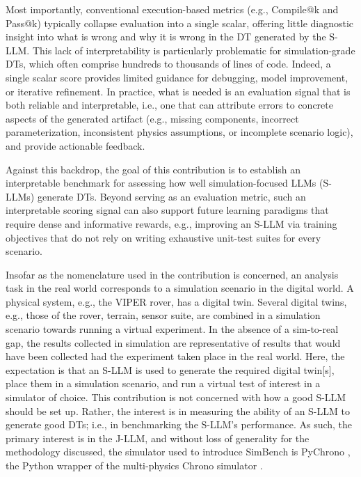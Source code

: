 \documentclass{ieeeaccess}
\begin{document}
Most importantly, conventional execution-based metrics (e.g., Compile@k and Pass@k)
typically collapse evaluation into a single scalar, 
offering little diagnostic insight into what is wrong and why it is wrong in the DT generated by the S-LLM.
This lack of interpretability is particularly problematic for simulation-grade DTs,
which often comprise hundreds to thousands of lines of code. Indeed, a single scalar score provides limited guidance for debugging, model improvement, or iterative refinement.
In practice, what is needed is an evaluation signal that is both reliable and interpretable, i.e., one that can
attribute errors to concrete aspects of the generated artifact (e.g., missing components,
incorrect parameterization, inconsistent physics assumptions, or incomplete scenario logic),
and provide actionable feedback.

Against this backdrop, the goal of this contribution is to establish an interpretable benchmark for assessing how well
simulation-focused LLMs (S-LLMs) generate DTs. Beyond serving as an evaluation metric,
such an interpretable scoring signal can also support future learning paradigms that require dense and
informative rewards, e.g., improving an S-LLM via training objectives that do not rely on writing
exhaustive unit-test suites for every scenario.
        
Insofar as the nomenclature used in the contribution is concerned, an analysis task in the real world corresponds to a simulation scenario in the digital world. A physical system, e.g., the VIPER rover, has a digital twin. Several digital twins, e.g., those of the rover, terrain, sensor suite, are combined in a simulation scenario towards running a virtual experiment.
 In the absence of a sim-to-real gap, the results collected in simulation are representative of results that
  would have been collected had the experiment taken place in the real world.
   Here, the expectation is that an S-LLM is used to generate the required digital twin[s],
    place them in a simulation scenario, and run a virtual test of interest in a simulator of choice.
     This contribution is not concerned with how a good S-LLM should be set up.
      Rather, the interest is in measuring the ability of an S-LLM to generate good DTs;
       i.e., in benchmarking the S-LLM's performance. As such, the primary interest is in the J-LLM, 
and without loss of generality for the methodology discussed, the simulator used to introduce SimBench is
 PyChrono \cite{pychrono2022}, the Python wrapper of the multi-physics Chrono simulator \cite{chronoOverview2016}. 
\end{document}
